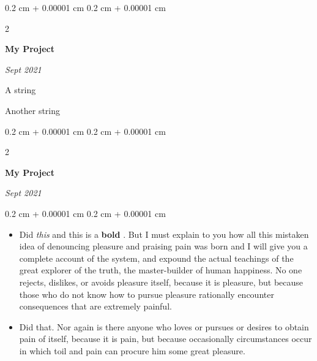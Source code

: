 \documentclass[10pt, letterpaper]{article}
\newenvironment{summary}{
    \begin{description}[
        topsep=0.10 cm,
        parsep=0.10 cm,
        partopsep=0pt,
        itemsep=0pt,
        leftmargin=0.4 cm + 10pt
    ]
}{
    \end{description}
} %
\newenvironment{highlights}{
    \begin{itemize}[
        topsep=0.10 cm,
        parsep=0.10 cm,
        partopsep=0pt,
        itemsep=0pt,
        leftmargin=0.4 cm + 10pt
    ]
}{
    \end{itemize}
} %
\newenvironment{onecolentry}{
    \begin{adjustwidth}{
        0.2 cm + 0.00001 cm
    }{
        0.2 cm + 0.00001 cm
    }
}{
    \end{adjustwidth}
} %
\newenvironment{twocolentry}[2][]{
    \onecolentry
    \def\secondColumn{#2}
    \setcolumnwidth{\fill, 4.5 cm}
    \begin{paracol}{2}
}{
    \switchcolumn \raggedleft \secondColumn
    \end{paracol}
    \endonecolentry
} %
\let\hrefWithoutArrow\href
\renewcommand{\href}[2]{\hrefWithoutArrow{#1}{\ifthenelse{\equal{#2}{}}{ }{#2 }\raisebox{.15ex}{\footnotesize \faExternalLink*}}}
\begin{document}
        \vspace{0.2 cm}

        \begin{twocolentry}{
            
            
        \textit{Sept 2021}}
            \textbf{My Project}
        \end{twocolentry}
            \begin{summary}
                \item A string
                \item Another string
            \end{summary}


        \vspace{0.2 cm}

        \begin{twocolentry}{
            
            
        \textit{Sept 2021}}
            \textbf{My Project}
        \end{twocolentry}
        \vspace{0.10 cm}
        \begin{onecolentry}
            \begin{highlights}
                \item Did \textit{this} and this is a \textbf{bold} \href{https://example.com}{link}. But I must explain to you how all this mistaken idea of denouncing pleasure and praising pain was born and I will give you a complete account of the system, and expound the actual teachings of the great explorer of the truth, the master-builder of human happiness. No one rejects, dislikes, or avoids pleasure itself, because it is pleasure, but because those who do not know how to pursue pleasure rationally encounter consequences that are extremely painful.
                \item Did that. Nor again is there anyone who loves or pursues or desires to obtain pain of itself, because it is pain, but because occasionally circumstances occur in which toil and pain can procure him some great pleasure.
            \end{highlights}
        \end{onecolentry}


        \vspace{0.2 cm}
\end{document}
